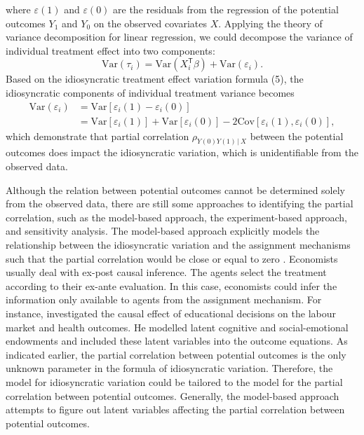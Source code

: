 	where $\varepsilon(1)$ and $\varepsilon(0)$ are the residuals from the regression of the potential outcomes $Y_{1}$ and $Y_{0}$ on the observed covariates $X$. Applying the theory of variance decomposition for linear regression, we could decompose the variance of individual treatment effect into two components:
	\begin{equation}
		\text{Var}(\tau_{i}) = \text{Var}(X_{i}^{\mathsf{T}}\beta) + \text{Var}(\varepsilon_{i}). 
	\end{equation}
	Based on the idiosyncratic treatment effect variation formula (5), the idiosyncratic components of individual treatment variance becomes
	\begin{equation}
		\begin{array}{cl}
			\text{Var}(\varepsilon_{i}) &= \text{Var}[\varepsilon_{i}(1) -\varepsilon_{i}(0)]\\ 
			&= \text{Var}[\varepsilon_{i}(1)] + \text{Var}[\varepsilon_{i}(0)] - 2\text{Cov}[\varepsilon_{i}(1), \varepsilon_{i}(0)], 
		\end{array}
	\end{equation} 
	which demonstrate that partial correlation $\rho_{Y(0)Y(1)\,|\ X}$ between the potential outcomes does impact the idiosyncratic variation, which is unidentifiable from the observed data. 
	
	Although the relation between potential outcomes cannot be determined solely from the observed data, there are still some approaches to identifying the partial correlation, such as the model-based approach, the experiment-based approach, and sensitivity analysis. The model-based approach explicitly models the relationship between the idiosyncratic variation and the assignment mechanisms such that the partial correlation would be close or equal to zero \citep{heckman2005scientific}. Economists usually deal with ex-post causal inference. The agents select the treatment according to their ex-ante evaluation. In this case, economists could infer the information only available to agents from the assignment mechanism.  For instance, \citet{heckman2010effects} investigated the causal effect of educational decisions on the labour market and health outcomes. He modelled latent cognitive and social-emotional endowments and included these latent variables into the outcome equations. As indicated earlier, the partial correlation between potential outcomes is the only unknown parameter in the formula of idiosyncratic variation. Therefore, the model for idiosyncratic variation could be tailored to the model for the partial correlation between potential outcomes. Generally, the model-based approach attempts to figure out latent variables affecting the partial correlation between potential outcomes. 
	
